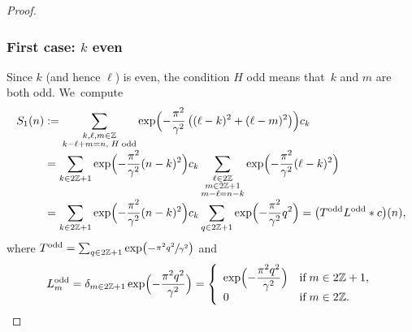 \documentclass[JEP,XML,SOM,Unicode,NoFloatCountersInSection,published]{cedram}
\theoremstyle{definition}
\let\EE\exp
\newcommand\Z{\mathbb Z}
\newcommand{\pa}[1]{\left(#1\right)}
\begin{document}
\begin{proof}
\subsubsection*{First case: $k$ even} Since $k$ (and hence $\ell$) is even, the condition $H$ odd means that~$k$ and $m$ are both odd. We~compute\vspace*{-3pt}
\begin{align*}
S_1(n) &:= \sum_{\substack {k, \ell, m \in \Z \\ k-\ell+m=n, \; H\; \text{odd}}}\EE\Bigl({-\frac{\pi^2}{\gamma^2}\pa{(\ell-k)^2+(\ell-m)^2}}\Bigr)c_{k} \\[-3pt]
&= \sum_{k\in 2\Z+1}\EE\Bigl({-\frac{\pi^2}{\gamma^2}(n-k)^2}\Bigr)c_{k} \sum_{\substack {\ell \in 2\Z \\ m \in 2\Z+1 \\ m-\ell = n-k}}\EE\Bigl({-\frac{\pi^2}{\gamma^2}(\ell-k)^2}\Bigr) \\[-3pt]
&= \sum_{k\in 2\Z+1}\EE\Bigl({-\frac{\pi^2}{\gamma^2}(n-k)^2}\Bigr)c_{k} \sum_{q \in 2\Z+1}\EE\Bigl({-\frac{\pi^2}{\gamma^2}q^2}\Bigr) = \bigl(T^{\text{odd}}L^{\text{odd}} * c\bigr)(n),
\end{align*}
where
$
T^{\text{odd}} = \sum_{q \in 2\Z+1}\EE\bigl({-\sfrac{\pi^2q^2}{\gamma^2}} \bigr)
$
and\vspace*{-5pt}
\begin{equation}\label{def-Lodd}
L_m^{\text{odd}} = \delta_{m\in2\Z+1}\EE\Bigl({-\dfrac{\pi^2q^2}{\gamma^2}} \Bigr) = \left\{
\begin{array}{ll}
\EE\Bigl({-\dfrac{\pi^2q^2}{\gamma^2}} \Bigr) & \text{if} \; m \in 2\Z+1, \\
0 \quad & \text{if} \; m \in 2\Z.
\end{array}
\right.
\end{equation}


\end{proof}
\end{document}
